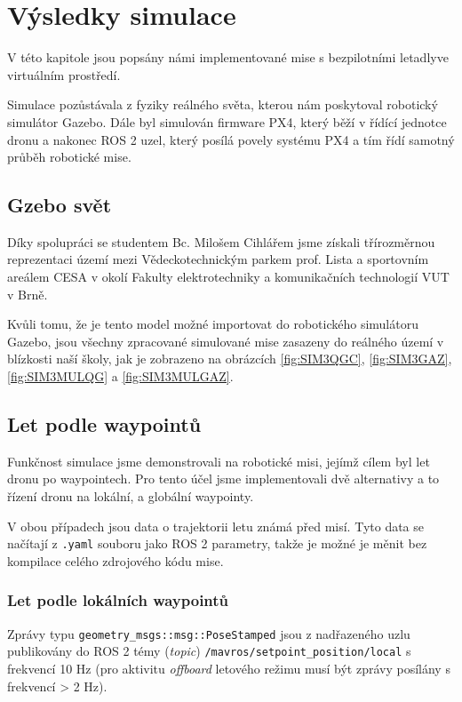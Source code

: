 \chapter{Výsledky simulace}

V této kapitole jsou popsány námi implementované mise s bezpilotními letadly\break ve virtuálním prostředí. 

Simulace pozůstávala z fyziky reálného světa, kterou nám poskytoval robotický simulátor Gazebo. Dále byl simulován firmware PX4, který běží v řídící jednotce dronu a nakonec ROS 2 uzel, který posílá povely systému PX4 a tím řídí samotný průběh robotické mise.

\section{Gzebo svět}

Díky spolupráci se studentem Bc. Milošem Cihlářem jsme získali třírozměrnou reprezentaci území mezi Vědeckotechnickým parkem prof. Lista a sportovním areálem CESA v okolí Fakulty elektrotechniky a komunikačních technologií VUT v Brně. 

Kvůli tomu, že je tento model možné importovat do robotického simulátoru Gazebo, jsou všechny zpracované simulované mise zasazeny do reálného území v blízkosti naší školy, jak je zobrazeno na obrázcích \ref{fig:SIM3QGC}, \ref{fig:SIM3GAZ}, \ref{fig:SIM3MULQG} a \ref{fig:SIM3MULGAZ}.

\section{Let podle waypointů}

Funkčnost simulace jsme demonstrovali na robotické misi, jejímž cílem byl let dronu po waypointech. Pro tento účel jsme implementovali dvě alternativy a to řízení dronu na lokální, a globální waypointy.

V obou případech jsou data o trajektorii letu známá před misí. Tyto data se načítají z \texttt{.yaml} souboru jako ROS 2 parametry, takže je možné je měnit bez kompilace celého zdrojového kódu mise. 

\subsection{Let podle lokálních waypointů}

Zprávy typu \texttt{geometry\_msgs::msg::PoseStamped} jsou z nadřazeného uzlu publikovány do ROS 2 témy (\textit{topic}) \texttt{/mavros/setpoint\_position/local} s frekvencí 10 Hz (pro aktivitu \textit{offboard} letového režimu musí být zprávy posílány s frekvencí > 2 Hz).

